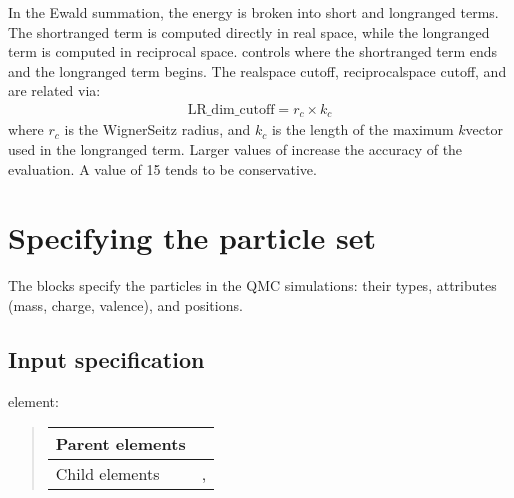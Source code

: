 \documentclass[letterpaper,10pt,english]{sphinxmanual}
\begin{document}
In the Ewald summation, the energy is broken into short\sphinxhyphen{} and long\sphinxhyphen{}ranged
terms. The short\sphinxhyphen{}ranged term is computed directly in real space, while
the long\sphinxhyphen{}ranged term is computed in reciprocal space. controls where the
short\sphinxhyphen{}ranged term ends and the long\sphinxhyphen{}ranged term begins. The real\sphinxhyphen{}space
cutoff, reciprocal\sphinxhyphen{}space cutoff, and are related via:
\begin{equation*}
\begin{split}\mathrm{LR\_dim\_cutoff} = r_{c} \times k_{c}\end{split}
\end{equation*}
where \(r_{c}\) is the Wigner\sphinxhyphen{}Seitz radius, and \(k_{c}\) is the
length of the maximum \(k\)\sphinxhyphen{}vector used in the long\sphinxhyphen{}ranged term.
Larger values of increase the accuracy of the evaluation. A value of 15
tends to be conservative.


\section{Specifying the particle set}
\label{\detokenize{simulationcell:specifying-the-particle-set}}\label{\detokenize{simulationcell:particleset}}
The  blocks specify the particles in the QMC simulations: their types,
attributes (mass, charge, valence), and positions.


\subsection{Input specification}
\label{\detokenize{simulationcell:input-specification}}
 element:
\begin{quote}


\begin{savenotes}\sphinxattablestart
\centering
\begin{tabulary}{\linewidth}[t]{|T|T|}
\hline

Parent elements
&
\\
\hline
Child elements
&
, 
\\
\hline
\end{tabulary}
\par
\sphinxattableend\end{savenotes}
\end{quote}
\end{document}
